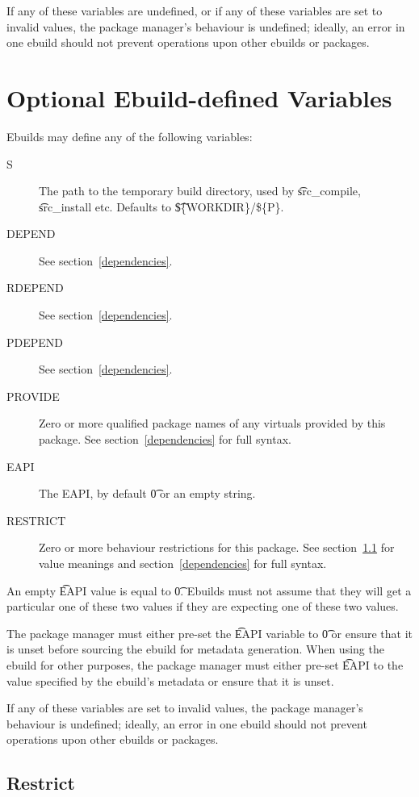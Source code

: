 If any of these variables are undefined, or if any of these variables are set to invalid values,
the package manager's behaviour is undefined; ideally, an error in one ebuild should not prevent
operations upon other ebuilds or packages.

\section{Optional Ebuild-defined Variables}

Ebuilds may define any of the following variables:

\begin{description}
\item[S] The path to the temporary build directory, used by \t{src\_compile}, \t{src\_install}
    etc. Defaults to \t{\$\{WORKDIR\}/\$\{P\}}.
\item[DEPEND] See section~\ref{dependencies}.
\item[RDEPEND] See section~\ref{dependencies}.
\item[PDEPEND] See section~\ref{dependencies}.
\item[PROVIDE] Zero or more qualified package names of any 
    virtuals provided by this package. See section~\ref{dependencies} for full syntax.
    \label{ebuild-var-provide}
\item[EAPI] The EAPI, by default \t{0} or an empty string.
\item[RESTRICT] Zero or more behaviour restrictions for this package. See section~\ref{restrict}
    for value meanings and section~\ref{dependencies} for full syntax.
\end{description}

An empty \t{EAPI} value is equal to \t{0}. Ebuilds must not assume that they will get a particular
one of these two values if they are expecting one of these two values.

The package manager must either pre-set the \t{EAPI} variable to \t{0} or ensure that it is unset
before sourcing the ebuild for metadata generation. When using the ebuild for other purposes, the
package manager must either pre-set \t{EAPI} to the value specified by the ebuild's metadata or
ensure that it is unset.

If any of these variables are set to invalid values, the package manager's behaviour is undefined;
ideally, an error in one ebuild should not prevent operations upon other ebuilds or packages.

\subsection{Restrict}
\label{restrict}

